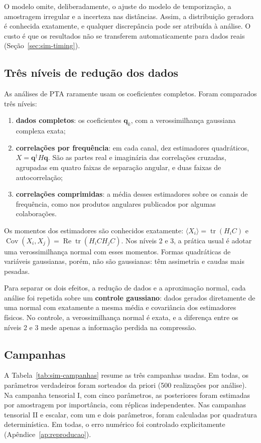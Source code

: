 O modelo omite, deliberadamente, o ajuste do modelo de temporização, a
amostragem irregular e a incerteza nas distâncias. Assim, a distribuição
geradora é conhecida exatamente, e qualquer discrepância pode ser
atribuída à análise. O custo é que os resultados não se transferem
automaticamente para dados reais (Seção~\ref{sec:sim-timing}).

\subsection{Três níveis de redução dos dados}

As análises de PTA raramente usam os coeficientes completos. Foram
comparados três níveis:
\begin{enumerate}
 \item \textbf{dados completos}: os coeficientes $\mathbf q_k$, com a
 verossimilhança gaussiana complexa exata;
 \item \textbf{correlações por frequência}: em cada canal, dez
 estimadores quadráticos, $X=\mathbf q^\dagger H\mathbf q$. São as partes
 real e imaginária das correlações cruzadas, agrupadas em quatro faixas
 de separação angular, e duas faixas de autocorrelação;
 \item \textbf{correlações comprimidas}: a média desses estimadores
 sobre os canais de frequência, como nos produtos angulares publicados
 por algumas colaborações.
\end{enumerate}
Os momentos dos estimadores são conhecidos exatamente:
$\langle X_i\rangle=\operatorname{tr}(H_iC)$ e
$\operatorname{Cov}(X_i,X_j)=\operatorname{Re}\operatorname{tr}(H_iCH_jC)$.
Nos níveis 2 e 3, a prática usual é adotar uma verossimilhança normal com
esses momentos. Formas quadráticas de variáveis gaussianas, porém, não
são gaussianas: têm assimetria e caudas mais pesadas.

Para separar os dois efeitos, a redução de dados e a aproximação normal,
cada análise foi repetida sobre um \textbf{controle gaussiano}: dados
gerados diretamente de uma normal com exatamente a mesma média e
covariância dos estimadores físicos. No controle, a verossimilhança
normal é exata, e a diferença entre os níveis 2 e 3 mede apenas a
informação perdida na compressão.

\subsection{Campanhas}

A Tabela~\ref{tab:sim-campanhas} resume as três campanhas usadas. Em
todas, os parâmetros verdadeiros foram sorteados da priori (500
realizações por análise). Na campanha tensorial I, com cinco parâmetros,
as posteriores foram estimadas por amostragem por importância, com
réplicas independentes. Nas campanhas tensorial II e escalar, com um e
dois parâmetros, foram calculadas por quadratura determinística. Em
todas, o erro numérico foi controlado explicitamente
(Apêndice~\ref{ap:reproducao}).

